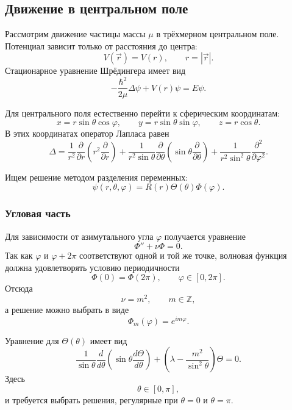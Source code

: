 \documentclass[12pt,a4paper]{article}
\begin{document}
\subsection{Движение в центральном поле}

Рассмотрим движение частицы массы $\mu$ в трёхмерном центральном поле.
Потенциал зависит только от расстояния до центра:
\[
    V(\vec r)=V(r),
    \qquad
    r=|\vec r|.
\]
Стационарное уравнение Шрёдингера имеет вид
\[
    \boxed{
        -\frac{\hbar^2}{2\mu}\Delta\psi
        +V(r)\psi
        =
        E\psi
    }.
\]

Для центрального поля естественно перейти к сферическим координатам:
\[
    x=r\sin\theta\cos\varphi,
    \qquad
    y=r\sin\theta\sin\varphi,
    \qquad
    z=r\cos\theta.
\]
В этих координатах оператор Лапласа равен
\[
    \Delta
    =
    \frac{1}{r^2}
    \frac{\partial}{\partial r}
    \left(
        r^2\frac{\partial}{\partial r}
    \right)
    +
    \frac{1}{r^2\sin\theta}
    \frac{\partial}{\partial\theta}
    \left(
        \sin\theta
        \frac{\partial}{\partial\theta}
    \right)
    +
    \frac{1}{r^2\sin^2\theta}
    \frac{\partial^2}{\partial\varphi^2}.
\]

Ищем решение методом разделения переменных:
\[
    \boxed{
        \psi(r,\theta,\varphi)
        =
        R(r)\Theta(\theta)\Phi(\varphi)
    }.
\]

\subsubsection{Угловая часть}

Для зависимости от азимутального угла $\varphi$ получается уравнение
\[
    \Phi''+\nu\Phi=0.
\]
Так как $\varphi$ и $\varphi+2\pi$ соответствуют одной и той же точке,
волновая функция должна удовлетворять условию периодичности
\[
    \Phi(0)=\Phi(2\pi),
    \qquad
    \varphi\in[0,2\pi].
\]
Отсюда
\[
    \nu=m^2,
    \qquad
    m\in\mathbb Z,
\]
а решение можно выбрать в виде
\[
    \boxed{
        \Phi_m(\varphi)=e^{im\varphi}
    }.
\]

Уравнение для $\Theta(\theta)$ имеет вид
\[
    \boxed{
    \frac{1}{\sin\theta}
    \frac{d}{d\theta}
    \left(
        \sin\theta\frac{d\Theta}{d\theta}
    \right)
    +
    \left(
        \lambda-\frac{m^2}{\sin^2\theta}
    \right)\Theta
    =
    0
    }.
\]
Здесь
\[
    \theta\in[0,\pi],
\]
и требуется выбрать решения, регулярные при $\theta=0$ и $\theta=\pi$.
\end{document}
